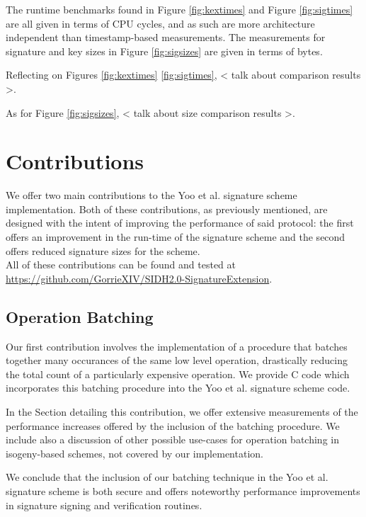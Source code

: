 The runtime benchmarks found in Figure \ref{fig:kextimes} and Figure \ref{fig:sigtimes} are all given in terms of CPU cycles, and as such are more architecture independent than timestamp-based measurements. The measurements for signature and key sizes in Figure \ref{fig:sigsizes} are given in terms of bytes. 

Reflecting on Figures \ref{fig:kextimes} \ref{fig:sigtimes}, < talk about comparison results >.

As for Figure \ref{fig:sigsizes}, < talk about size comparison results >.

\section{Contributions}

We offer two main contributions to the Yoo et al. signature scheme implementation. Both of these contributions, as previously mentioned, are designed with the intent of improving the performance of said protocol: the first offers an improvement in the run-time of the signature scheme and the second offers reduced signature sizes for the scheme.\\

\noindent
All of these contributions can be found and tested at \url{https://github.com/GorrieXIV/SIDH2.0-SignatureExtension}.

\subsection{Operation Batching}

Our first contribution involves the implementation of a procedure that batches together many occurances of the same low level operation, drastically reducing the total count of a particularly expensive operation. We provide C code which incorporates this batching procedure into the Yoo et al. signature scheme code.

In the Section detailing this contribution, we offer extensive measurements of the performance increases offered by the inclusion of the batching procedure. We include also a discussion of other possible use-cases for operation batching in isogeny-based schemes, not covered by our implementation.

We conclude that the inclusion of our batching technique in the Yoo et al. signature scheme is both secure and offers noteworthy performance improvements in signature signing and verification routines.

